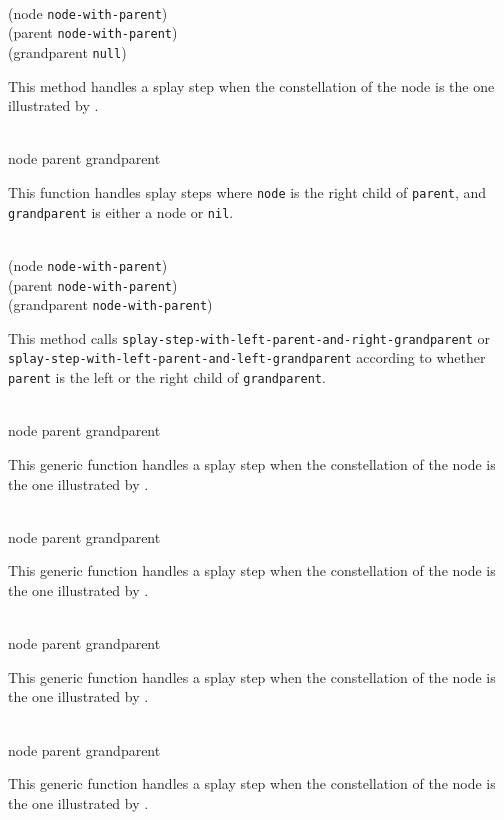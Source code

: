 \\
{(node \texttt{node-with-parent})\\
 (parent \texttt{node-with-parent})\\
 (grandparent \texttt{null})}

This method handles a splay step when the constellation of the node is
the one illustrated by .

\\
{node parent grandparent}

This function handles splay steps where \texttt{node} is the right
child of \texttt{parent}, and \texttt{grandparent} is either a node or
\texttt{nil}.

\\
{(node \texttt{node-with-parent})\\
 (parent \texttt{node-with-parent})\\
 (grandparent \texttt{node-with-parent})}

This method calls
\texttt{splay-step-with-left-parent-and-right-grandparent} or
\texttt{splay-step-with-left-parent-and-left-grandparent} according
to whether \texttt{parent} is the left or the right child of
\texttt{grandparent}.

\\
{node parent grandparent}

This generic function handles a splay step when the constellation of
the node is the one illustrated by .

\\
{node parent grandparent}

This generic function handles a splay step when the constellation of
the node is the one illustrated by .

\\
{node parent grandparent}

This generic function handles a splay step when the constellation of
the node is the one illustrated by .

\\
{node parent grandparent}

This generic function handles a splay step when the constellation of
the node is the one illustrated by .
